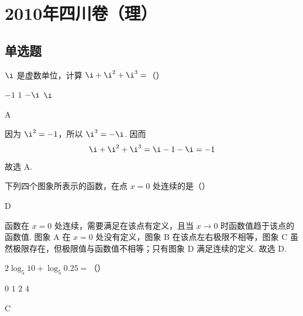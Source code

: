 \chapter{2010年四川卷（理）}

\section{单选题}

\begin{problem}
\(\i\) 是虚数单位，计算 \(\i + \i^2 + \i^3 =\)（\quad）

\choices
    {\(-1\)}
    {\(1\)}
    {\(-\i\)}
    {\(\i\)}
\end{problem}

\begin{answer}
A
\end{answer}

\begin{solution}
因为 \(\i^2=-1\)，所以 \(\i^3=-\i\). 因而
\[
\i+\i^2+\i^3=\i-1-\i=-1
\]
故选 A.
\end{solution}

\begin{problem}
下列四个图象所表示的函数，在点 \(x = 0\) 处连续的是（\quad）

    {}
    {}
    {}
\end{problem}

\begin{answer}
D
\end{answer}

\begin{solution}
函数在 \(x=0\) 处连续，需要满足在该点有定义，且当 \(x\to0\) 时函数值趋于该点的函数值. 图象 A 在 \(x=0\) 处没有定义，图象 B 在该点左右极限不相等，图象 C 虽然极限存在，但极限值与函数值不相等；只有图象 D 满足连续的定义.
故选 D.
\end{solution}

\begin{problem}
\(2\log_{5}10 + \log_{5}0.25 =\)（\quad）

\choices
    {\(0\)}
    {\(1\)}
    {\(2\)}
    {\(4\)}
\end{problem}

\begin{answer}
C
\end{answer}

